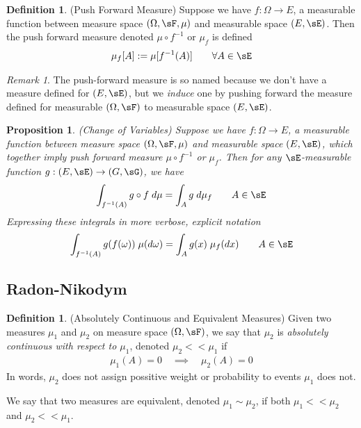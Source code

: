 \documentclass[12pt]{article}
\theoremstyle{plain}
\newtheorem{prop}[thm]{Proposition}
\theoremstyle{definition}
\newtheorem{defn}[thm]{Definition}
\theoremstyle{remark}
\newtheorem*{rmk}{Remark}
\newcommand{\ra}{\rightarrow}
\begin{document}
\begin{defn}(Push Forward Measure)
Suppose we have $f:\Omega\ra E$, a measurable function between measure
space $(\Omega,\sF,\mu)$ and measurable space $(E,\sE)$. Then the push
forward measure denoted $\mu \circ f^{-1}$ or $\mu_f$ is defined
\begin{align*}
  \mu_f[A] := \mu[f^{-1}(A)]
  \qquad\forall A \in\sE
\end{align*}
\end{defn}
\begin{rmk}
The push-forward measure is so named because we don't have a measure
defined for $(E,\sE)$, but we \emph{induce} one by pushing forward the
measure defined for measurable $(\Omega,\sF)$ to measurable space
$(E,\sE)$.
\end{rmk}

\begin{prop}\emph{(Change of Variables)}
Suppose we have $f:\Omega\ra E$, a measurable function between measure
space $(\Omega,\sF,\mu)$ and measurable space $(E,\sE)$, which together
imply push forward measure $\mu \circ f^{-1}$ or $\mu_f$. Then for any
$\sE$-measurable function $g:(E,\sE)\ra(G,\sG)$, we have
\begin{align*}
  \int_{f^{-1}(A)} g\circ f \; d\mu
  =
  \int_A g\;d\mu_f
  \qquad A \in \sE
\end{align*}
Expressing these integrals in more verbose, explicit notation
\begin{align*}
  \int_{f^{-1}(A)} g(f(\omega)) \; \mu(d\omega)
  =
  \int_A g(x)\;\mu_f(dx)
  \qquad A \in \sE
\end{align*}
\end{prop}

\clearpage
\subsection{Radon-Nikodym}

\begin{defn}(Absolutely Continuous and Equivalent Measures)
Given two measures $\mu_1$ and $\mu_2$ on measure space $(\Omega,\sF)$,
we say that $\mu_2$ is
\emph{absolutely continuous with respect to $\mu_1$}, denoted
$\mu_2<<\mu_1$ if
\begin{align*}
  \mu_1(A) = 0
  \quad\implies\quad
  \mu_2(A) = 0
\end{align*}
In words, $\mu_2$ does not assign possitive weight or probability to
events $\mu_1$ does not.

We say that two measures are equivalent, denoted $\mu_1\sim \mu_2$, if
both $\mu_1<<\mu_2$ and $\mu_2<<\mu_1$.
\end{defn}
\end{document}
